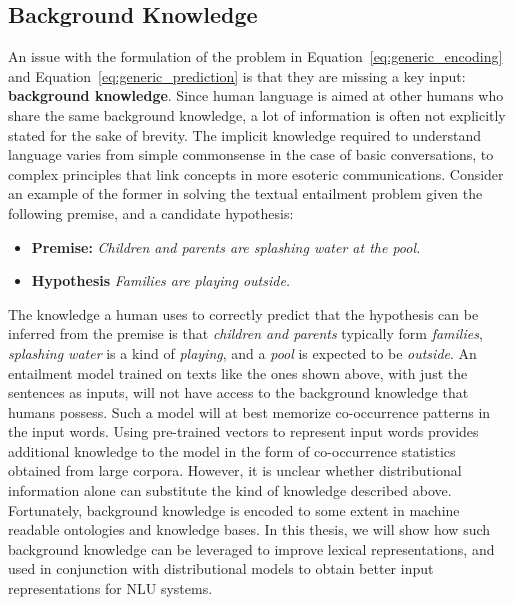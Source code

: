 \subsection{Background Knowledge}
An issue with the formulation of the problem in Equation~\ref{eq:generic_encoding} and Equation~\ref{eq:generic_prediction} is that they are missing a key input: \textbf{background knowledge}. 
Since human language is aimed at other humans who share 
the same background knowledge, a lot of information is often not explicitly stated
for the sake of brevity. The implicit knowledge required to understand language varies 
from simple commonsense in the case of basic conversations, to complex principles that link 
concepts in more esoteric communications. Consider an example of the former in solving the 
textual entailment problem given the following premise, and a candidate hypothesis:
\begin{itemize}
 \item \textbf{Premise:} \textit{Children and parents are splashing water at the pool.}
 \item \textbf{Hypothesis} \textit{Families are playing outside.}
\end{itemize}
The knowledge a human uses to correctly predict that the hypothesis can be inferred from the 
premise is that \textit{children and parents} typically form \textit{families}, \textit{splashing water} 
is a kind of \textit{playing}, and a \textit{pool} is expected to be \textit{outside}. An entailment model trained on texts like the
ones shown above, with just the sentences as inputs, will not have access to the background knowledge that humans possess. Such a model
will at best memorize co-occurrence patterns in the input words. Using pre-trained vectors to represent input words provides additional
knowledge to the model in the form of co-occurrence statistics obtained from large corpora. However, it is unclear whether distributional
information alone can substitute the kind of knowledge described above. Fortunately, background knowledge is encoded to some extent in machine readable
ontologies and knowledge bases. In this thesis, we will show how such background knowledge can be leveraged to improve lexical representations, and used
in conjunction with distributional models to obtain better input representations for NLU systems.

